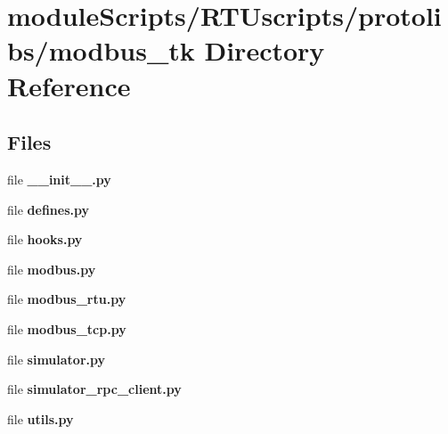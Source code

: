 \section{module\+Scripts/\+R\+T\+Uscripts/protolibs/modbus\+\_\+tk Directory Reference}
\label{dir_dd0390c70d32bef99d2e475b452dd08d}
\subsection*{Files}
\begin{DoxyCompactItemize}
\item 
file {\bf \+\_\+\+\_\+init\+\_\+\+\_\+.\+py}
\item 
file {\bf defines.\+py}
\item 
file {\bf hooks.\+py}
\item 
file {\bf modbus.\+py}
\item 
file {\bf modbus\+\_\+rtu.\+py}
\item 
file {\bf modbus\+\_\+tcp.\+py}
\item 
file {\bf simulator.\+py}
\item 
file {\bf simulator\+\_\+rpc\+\_\+client.\+py}
\item 
file {\bf utils.\+py}
\end{DoxyCompactItemize}
